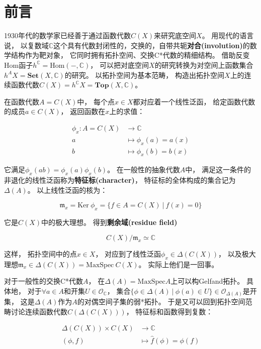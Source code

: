\documentclass[10pt, openany]{book}
\begin{document}
\mainmatter


\chapter{前言}

1930年代的数学家已经善于通过函数代数$C(X)$来研究底空间$X$。
用现代的语言说，
以复数域$\mathbb C$这个具有代数封闭性的，交换的，自带共轭\textbf{对合(involution)}的数学结构作为靶对象，
它同时拥有拓扑空间、交换C*代数的精细结构。
借助反变Hom函子$h^\mathbb C = \text{Hom}(-,\mathbb C)$，
可以把对底空间$X$的研究转换为对空间上函数集合$h^A X = \textbf{Set}(X,\mathbb C)$的研究。
以拓扑空间为基本范畴，
构造出拓扑空间$X$上的连续函数代数$C(X) = h^\mathbb C X = \textbf{Top}(X,\mathbb C)$。

在函数代数$A = C(X)$中，
每个点$x \in X$都对应着一个线性泛函，
给定函数代数的成员$a\in C(X)$，
返回函数在$x$上的求值：

$$
\begin{aligned}
  \phi_x: A = C(X) &\to \mathbb C \\
  a &\mapsto \phi_x(a) = a(x) \\
  b &\mapsto \phi_x(b) = b(x)
\end{aligned}
$$

它满足$\phi_x(ab) = \phi_x(a)\phi_x(b)$。
在一般性的抽象代数$A$中，
满足这一条件的非退化的线性泛函称为\textbf{特征标(character)}，
特征标的全体构成的集合记为$\Delta(A)$。
以上线性泛函的核为：

$$
\mathfrak m_x = \text{Ker} \ \phi_x = \{ f \in A = C(X) \ | \ f(x) = 0 \}
$$

它是$C(X)$中的极大理想。
得到\textbf{剩余域(residue field)}

$$
C(X)/\mathfrak m_x \simeq \mathbb C
$$

这样，
拓扑空间中的点$x\in X$，
对应到了线性泛函$\phi_x \in \Delta(C(X))$，
以及极大理想$\mathfrak m_x \in \Delta(C(X)) = \text{MaxSpec} \ C(X)$。
实际上他们是一回事。

对于一般性的交换C*代数$A$，
在$\Delta(A) = \text{MaxSpec} A$上可以构Gelfand拓扑。
具体地，
对于$\forall a \in A$和开集$U \in \mathcal O_\mathbb C$，
集合$\{ \phi \in \Delta(A) \ | \ \phi(a) \in U \} \in \mathcal O_{\Delta(A)}$是开集，
这是$\Delta(A)$作为$A$的对偶空间子集的弱*拓扑。
于是又可以回到拓扑空间范畴讨论连续函数代数$C(\Delta(C(X)))$，
特征标和函数得到复数：

$$
\begin{aligned}
  \Delta(C(X)) \times C(X) &\to \mathbb C \\
  (\phi,f) &\mapsto \hat f(\phi) = \phi(f)
\end{aligned}
$$
\end{document}
